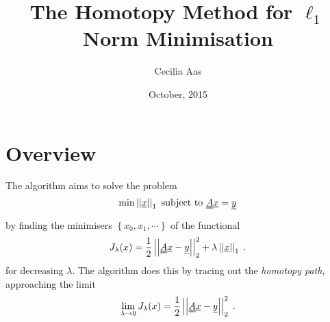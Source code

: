 \documentclass[11pt]{article} %
\title{The Homotopy Method for $\ell_1$ Norm Minimisation}
\author{Cecilia Aas}
\date{October, 2015}
\begin{document}
\maketitle
\section{Overview}
The algorithm aims to solve the problem
\begin{equation}
\label{eq:l1min}
\min\left|\left| \uline{x} \right| \right|_1 \text{ subject to } \uuline{A}\uline{x} = \uline{y}
\end{equation}
by finding the minimisers $\left\{x_0, x_1, \cdots \right\}$ of the functional
\begin{equation}
J_{\lambda}(x) = \frac{1}{2} \left| \left|\uuline{A} \uline{x} - \uline{y} \right| \right|_2^2 + \lambda \left| \left| \uline{x} \right| \right|_1 \; .
\end{equation}
for decreasing $\lambda$.  The algorithm does this by tracing out the \textit{homotopy path}, approaching the limit
\begin{equation}
\lim_{\lambda \rightarrow 0} J_{\lambda}(x) = \frac{1}{2} \left| \left|\uuline{A} \uline{x} - \uline{y} \right| \right|_2^2 \; .
\end{equation}
\end{document}
